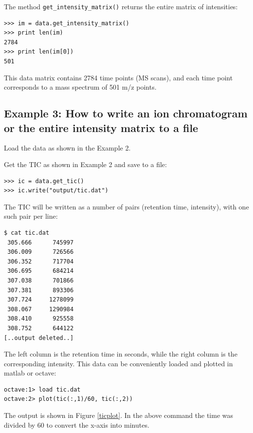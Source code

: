The method {\tt get\_intensity\_matrix()} returns the entire matrix of
intensities:

\begin{verbatim}
>>> im = data.get_intensity_matrix()
>>> print len(im)
2784
>>> print len(im[0])
501
\end{verbatim}

\noindent
This data matrix contains 2784 time points (MS scans), and each time point
corresponds to a mass spectrum of 501 m/z points.

\subsection{Example 3: How to write an ion chromatogram or the entire
intensity matrix to a file}

Load the data as shown in the Example 2.

Get the TIC as shown in Example 2 and save to a file:

\begin{verbatim}
>>> ic = data.get_tic()
>>> ic.write("output/tic.dat")
\end{verbatim}

\noindent
The TIC will be written as a number of pairs (retention time, intensity),
with one such pair per line:

\begin{verbatim}
$ cat tic.dat
 305.666      745997
 306.009      726566
 306.352      717704
 306.695      684214
 307.038      701866
 307.381      893306
 307.724     1278099
 308.067     1290984
 308.410      925558
 308.752      644122
[..output deleted..]
\end{verbatim}

\noindent
The left column is the retention time in seconds, while the right column
is the corresponding intensity. This data can be conveniently loaded and
plotted in matlab or octave:

\begin{verbatim}
octave:1> load tic.dat
octave:2> plot(tic(:,1)/60, tic(:,2))
\end{verbatim}

The output is shown in Figure \ref{ticplot}. In the above command the
time was divided by 60 to convert the x-axis into minutes.


